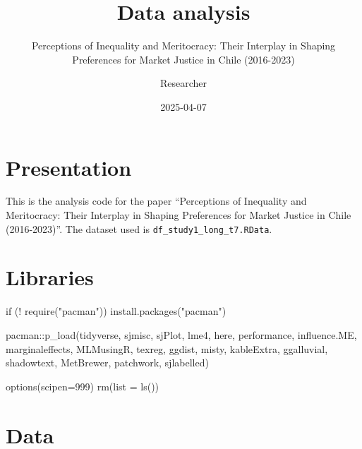 \documentclass[
  12pt,
  letterpaper,
  DIV=11,
  numbers=noendperiod]{scrartcl}
\title{Data analysis}
\subtitle{Perceptions of Inequality and Meritocracy: Their Interplay in
Shaping Preferences for Market Justice in Chile (2016-2023)}
\author{Researcher}
\date{2025-04-07}
\newenvironment{Shaded}{\begin{snugshade}}{\end{snugshade}}
\newcommand{\AttributeTok}[1]{\textcolor[rgb]{0.40,0.45,0.13}{#1}}
\newcommand{\ControlFlowTok}[1]{\textcolor[rgb]{0.00,0.23,0.31}{#1}}
\newcommand{\DecValTok}[1]{\textcolor[rgb]{0.68,0.00,0.00}{#1}}
\newcommand{\FunctionTok}[1]{\textcolor[rgb]{0.28,0.35,0.67}{#1}}
\newcommand{\NormalTok}[1]{\textcolor[rgb]{0.00,0.23,0.31}{#1}}
\newcommand{\SpecialCharTok}[1]{\textcolor[rgb]{0.37,0.37,0.37}{#1}}
\newcommand{\StringTok}[1]{\textcolor[rgb]{0.13,0.47,0.30}{#1}}
\begin{document}
\maketitle

\section{Presentation}\label{presentation}

This is the analysis code for the paper ``Perceptions of Inequality and
Meritocracy: Their Interplay in Shaping Preferences for Market Justice
in Chile (2016-2023)''. The dataset used is
\texttt{df\_study1\_long\_t7.RData}.

\section{Libraries}\label{libraries}

\begin{Shaded}
\begin{Highlighting}[]
\ControlFlowTok{if}\NormalTok{ (}\SpecialCharTok{!} \FunctionTok{require}\NormalTok{(}\StringTok{"pacman"}\NormalTok{)) }\FunctionTok{install.packages}\NormalTok{(}\StringTok{"pacman"}\NormalTok{)}

\NormalTok{pacman}\SpecialCharTok{::}\FunctionTok{p\_load}\NormalTok{(tidyverse, }
\NormalTok{               sjmisc, }
\NormalTok{               sjPlot, }
\NormalTok{               lme4, }
\NormalTok{               here, }
\NormalTok{               performance,}
\NormalTok{               influence.ME, }
\NormalTok{               marginaleffects,}
\NormalTok{               MLMusingR,}
\NormalTok{               texreg, }
\NormalTok{               ggdist,}
\NormalTok{               misty,}
\NormalTok{               kableExtra,}
\NormalTok{               ggalluvial, }
\NormalTok{               shadowtext,}
\NormalTok{               MetBrewer,}
\NormalTok{               patchwork,}
\NormalTok{               sjlabelled)}


\FunctionTok{options}\NormalTok{(}\AttributeTok{scipen=}\DecValTok{999}\NormalTok{)}
\FunctionTok{rm}\NormalTok{(}\AttributeTok{list =} \FunctionTok{ls}\NormalTok{())}
\end{Highlighting}
\end{Shaded}

\section{Data}\label{data}
\end{document}
